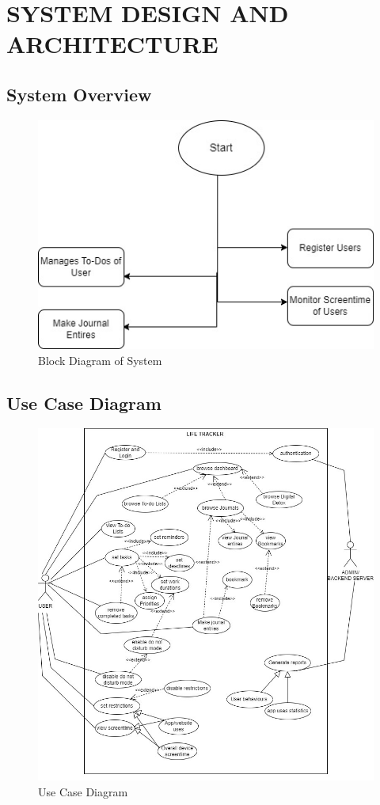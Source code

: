 \section{SYSTEM DESIGN AND ARCHITECTURE}
\subsection{System Overview}
\begin{figure}[h]
    \centering
    \includegraphics{system.jpg}
    \caption{Block Diagram of System}
    \label{fig:System OVerview}
\end{figure}

\newpage
\subsection{Use Case Diagram}
\begin{figure}[h]
    \centering
     \includegraphics[width=150mm]{Use_Case.jpg}
    \caption{Use Case Diagram}
    \label{fig:Use Case Diagram}
\end{figure}

